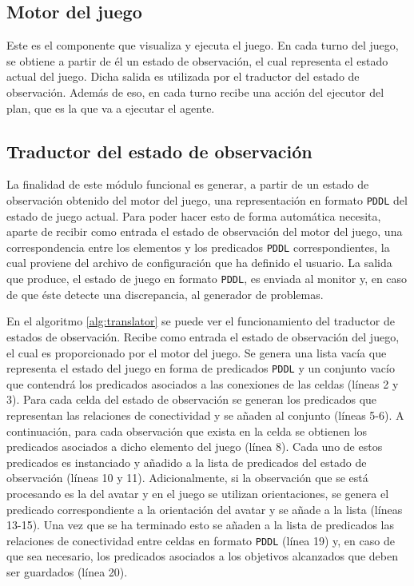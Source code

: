 \subsection{Motor del juego}

Este es el componente que visualiza y ejecuta el juego. En cada turno del juego, se obtiene a partir de él un
estado de observación, el cual representa el estado actual del juego. Dicha salida es utilizada por el
traductor del estado de observación. Además de eso, en cada turno recibe una acción del ejecutor del plan,
que es la que va a ejecutar el agente.

\subsection{Traductor del estado de observación}
\label{sec:translate-state}

La finalidad de este módulo funcional es generar, a partir de un estado de observación obtenido del
motor del juego, una representación en formato \texttt{PDDL} del estado de juego actual. Para poder
hacer esto de forma automática necesita, aparte de recibir como entrada el estado de observación del
motor del juego, una correspondencia entre los elementos y los predicados \texttt{PDDL} correspondientes,
la cual proviene del archivo de configuración que ha definido el usuario. La salida que produce,
el estado de juego en formato \texttt{PDDL}, es enviada al monitor y, en caso de que éste detecte
una discrepancia, al generador de problemas.

En el algoritmo \ref{alg:translator} se puede ver el funcionamiento del traductor de estados de
observación. Recibe como entrada el estado de observación del juego, el cual es proporcionado
por el motor del juego. Se genera una lista vacía que representa el estado del juego en forma de predicados
\texttt{PDDL} y un conjunto vacío que contendrá los predicados asociados a las conexiones de las celdas
(líneas 2 y 3). Para cada celda del estado de observación se generan los predicados que representan las relaciones
de conectividad y se añaden al conjunto (líneas 5-6). A continuación, para cada observación que exista
en la celda se obtienen los predicados asociados a dicho elemento del juego (línea 8). Cada uno de estos
predicados es instanciado y añadido a la lista de predicados del estado de observación (líneas 10 y 11). Adicionalmente, si la observación que se está procesando es la del avatar y en el juego se utilizan orientaciones,
se genera el predicado correspondiente a la orientación del avatar y se añade a la lista (líneas 13-15).
Una vez que se ha terminado esto se añaden a la lista de predicados las relaciones de conectividad entre celdas en
formato \texttt{PDDL} (línea 19) y, en caso de que sea necesario, los predicados asociados a los objetivos
alcanzados que deben ser guardados (línea 20).

